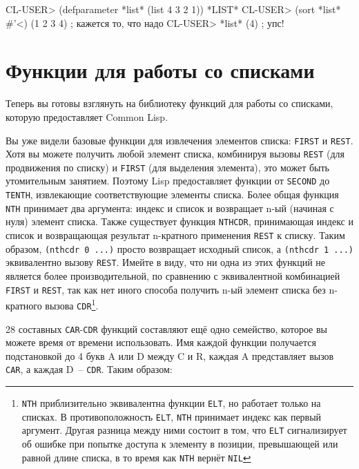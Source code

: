 \begin{myverb}
CL-USER> (defparameter *list* (list 4 3 2 1))
*LIST*
CL-USER> (sort *list* #'<)
(1 2 3 4)                      ; кажется то, что надо
CL-USER> *list*
(4)                            ; упс!
\end{myverb}

\section{Функции для работы со списками}
\label{sec:12-list-funcs}

Теперь вы готовы взглянуть на библиотеку функций для работы со списками, которую
предоставляет Common Lisp.

Вы уже видели базовые функции для извлечения элементов списка: \lstinline{FIRST} и
\lstinline{REST}. Хотя вы можете получить любой элемент списка, комбинируя вызовы \lstinline{REST}
(для продвижения по списку) и \lstinline{FIRST} (для выделения элемента), это может быть
утомительным занятием. Поэтому Lisp предоставляет функции от \lstinline{SECOND} до \lstinline{TENTH},
извлекающие соответствующие элементы списка. Более общая функция \lstinline{NTH} принимает два
аргумента: индекс и список и возвращает n-ый (начиная с нуля) элемент списка. Также
существует функция \lstinline{NTHCDR}, принимающая индекс и список и возвращающая результат
n-кратного применения \lstinline{REST} к списку. Таким образом, \lstinline{(nthcdr 0 ...)}  просто
возвращает исходный список, а \lstinline{(nthcdr 1 ...)}  эквивалентно вызову
\lstinline{REST}. Имейте в виду, что ни одна из этих функций не является более производительной,
по сравнению с эквивалентной комбинацией \lstinline{FIRST} и \lstinline{REST}, так как нет иного
способа получить n-ый элемент списка без n-кратного вызова \lstinline{CDR}\footnote{\lstinline{NTH}
  приблизительно эквивалентна функции \lstinline{ELT}, но работает только на списках. В
  противоположность \lstinline{ELT}, \lstinline{NTH} принимает индекс как первый аргумент. Другая
  разница между ними состоит в том, что \lstinline{ELT} сигнализирует об ошибке при попытке
  доступа к элементу в позиции, превышающей или равной длине списка, в то время как
  \lstinline{NTH} вернёт \lstinline{NIL}}.

28 составных \lstinline{CAR}-\lstinline{CDR} функций составляют ещё одно семейство, которое вы можете время
от времени использовать. Имя каждой функции получается подстановкой до 4 букв A или D
между C и R, каждая A представляет вызов \lstinline{CAR}, а каждая D~-- \lstinline{CDR}. Таким
образом:


